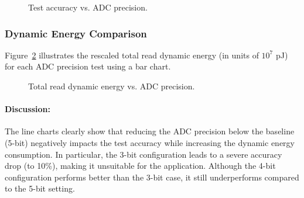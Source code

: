 \documentclass[11pt]{article}
\begin{document}
\begin{figure}[H]
    \centering
    \caption{Test accuracy vs. ADC precision.}
    \label{fig:adc_accuracy_line}
\end{figure}

\subsubsection{Dynamic Energy Comparison}
Figure~\ref{fig:adc_energy_bar} illustrates the rescaled total read dynamic energy (in units of $10^7$ pJ) for each ADC precision test using a bar chart.

\begin{figure}[H]
    \centering
    \caption{Total read dynamic energy vs. ADC precision.}
    \label{fig:adc_energy_bar}
\end{figure}


\paragraph{Discussion:}
The line charts clearly show that reducing the ADC precision below the baseline (5-bit) negatively impacts the test accuracy while increasing the dynamic energy consumption. In particular, the 3-bit configuration leads to a severe accuracy drop (to 10\%), making it unsuitable for the application. Although the 4-bit configuration performs better than the 3-bit case, it still underperforms compared to the 5-bit setting.
\end{document}
